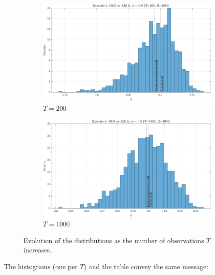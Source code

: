 \documentclass[dvipsnames,11pt]{article}
\begin{document}
\begin{solution}
\begin{figure}[h]
\begin{subfigure}[b]{0.49\textwidth}
                         \centering
                         \includegraphics[width=\textwidth, trim=0cm 0cm 0cm 0.55cm, clip]{output/ex4_hist_T200.png}
                         \caption{\(T=200\)}
                         \label{fig:ex4_hist_T200}
                     \end{subfigure}
                     \hfill
                     \begin{subfigure}[b]{0.49\textwidth}
                         \centering
                         \includegraphics[width=\textwidth, trim=0cm 0cm 0cm 0.55cm, clip]{output/ex4_hist_T1000.png}
                         \caption{\(T=1000\)}
                         \label{fig:ex4_hist_T1000}
                     \end{subfigure}
                    \label{fig:ex_1c}
                    \caption{Evolution of the distributions as the number of observations \(T\) increases.}
                \end{figure}

        The histograms (one per $T$) and the table convey the same message:
        

\end{solution}
\end{document}
